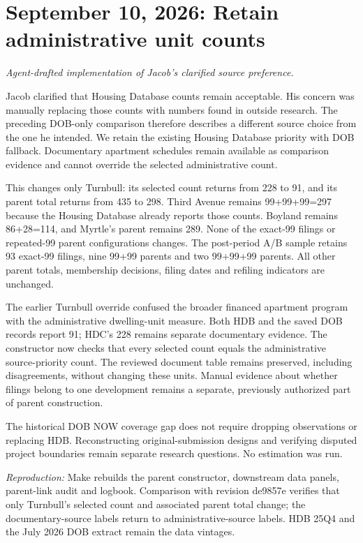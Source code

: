 \clearpage
\section*{September 10, 2026: Retain administrative unit counts}
\textit{Agent-drafted implementation of Jacob's clarified source preference.}

Jacob clarified that Housing Database counts remain acceptable. His concern was manually replacing those counts with numbers found in outside research. The preceding DOB-only comparison therefore describes a different source choice from the one he intended. We retain the existing Housing Database priority with DOB fallback. Documentary apartment schedules remain available as comparison evidence and cannot override the selected administrative count.

This changes only Turnbull: its selected count returns from 228 to 91, and its parent total returns from 435 to 298. Third Avenue remains 99+99+99=297 because the Housing Database already reports those counts. Boyland remains 86+28=114, and Myrtle's parent remains 289. None of the exact-99 filings or repeated-99 parent configurations changes. The post-period A/B sample retains 93 exact-99 filings, nine 99+99 parents and two 99+99+99 parents. All other parent totals, membership decisions, filing dates and refiling indicators are unchanged.

The earlier Turnbull override confused the broader financed apartment program with the administrative dwelling-unit measure. Both HDB and the saved DOB records report 91; HDC's 228 remains separate documentary evidence. The constructor now checks that every selected count equals the administrative source-priority count. The reviewed document table remains preserved, including disagreements, without changing these units. Manual evidence about whether filings belong to one development remains a separate, previously authorized part of parent construction.

The historical DOB NOW coverage gap does not require dropping observations or replacing HDB. Reconstructing original-submission designs and verifying disputed project boundaries remain separate research questions. No estimation was run.

\textit{Reproduction:} Make rebuilds the parent constructor, downstream data panels, parent-link audit and logbook. Comparison with revision de9857e verifies that only Turnbull's selected count and associated parent total change; the documentary-source labels return to administrative-source labels. HDB 25Q4 and the July 2026 DOB extract remain the data vintages.
